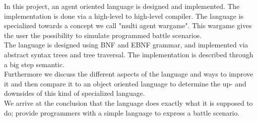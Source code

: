 In this project, an agent oriented language is designed and implemented. The implementation is done via a high-level to high-level compiler. The language is specialized towards a concept we call "multi agent wargame". This wargame gives the user the possibility to simulate programmed battle scenarios.\\ \indent
The language is designed using BNF and EBNF grammar, and implemented via abstract syntax trees and tree traversal. The implementation is described through a big step semantic.\\ 
\indent Furthermore we discuss the different aspects of the language and ways to improve it and then compare it to an object oriented language to determine the up- and downsides of this kind of specialized language.\\ 
\indent We arrive at the conclusion that the language does exactly what it is supposed to do; provide programmers with a simple language to express a battle scenario.
